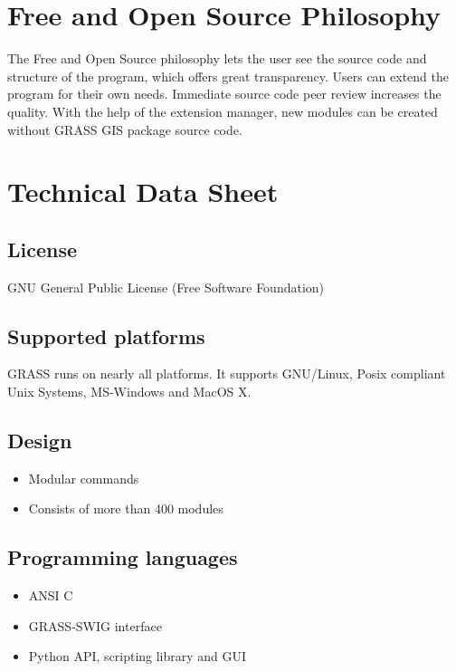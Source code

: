 \documentclass[notumble,a4paper,10pt,nofoldmark]{leaflet}
\begin{document}
\section{Free and Open Source Philosophy}

The Free and Open Source philosophy lets the user see the source code and structure of the program, which offers great transparency. Users can extend the program for their own needs. Immediate source code peer review increases the quality. With the help of the extension manager, new modules can be created without GRASS GIS package source code.

\section{Technical Data Sheet}

\subsection{License}

GNU General Public License (Free Software Foundation)

\subsection{Supported platforms}

GRASS runs on nearly all platforms. It supports GNU/Linux, Posix compliant Unix Systems, MS-Windows and MacOS X.

\subsection{Design}

\begin{itemize}
\item Modular commands
\item Consists of more than 400 modules
\end{itemize}

\subsection{Programming languages}

\begin{itemize}
\item ANSI C
\item GRASS-SWIG interface
\item Python API, scripting library and GUI
\end{itemize}
\end{document}

